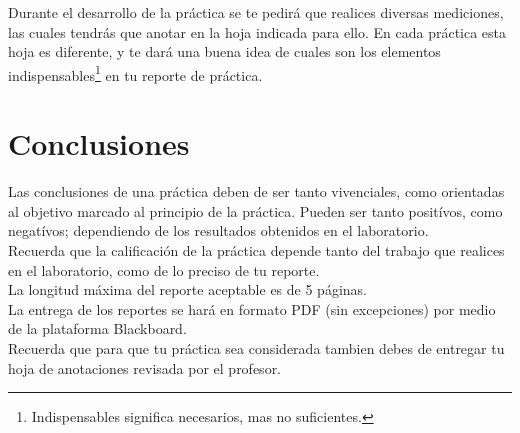     Durante el desarrollo de la práctica se te pedirá que realices diversas mediciones, las cuales tendrás que anotar en la hoja indicada para ello. En cada práctica esta hoja es diferente, y te dará una buena idea de cuales son los elementos indispensables\footnote{Indispensables significa necesarios, mas no suficientes.} en tu reporte de práctica. \\


\section{Conclusiones}
	Las conclusiones de una práctica deben de ser tanto vivenciales, como orientadas al objetivo marcado al principio de la práctica. Pueden ser tanto positívos, como negatívos; dependiendo de los resultados obtenidos en el laboratorio. \\

	Recuerda que la calificación de la práctica depende tanto del trabajo que realices en el laboratorio, como de lo preciso de tu reporte. \\

	La longitud máxima del reporte aceptable es de 5 páginas. \\

	La entrega de los reportes se hará en formato PDF (sin excepciones) por medio de la plataforma Blackboard. \\

	Recuerda que para que tu práctica sea considerada tambien debes de entregar tu hoja de anotaciones revisada por el profesor.




